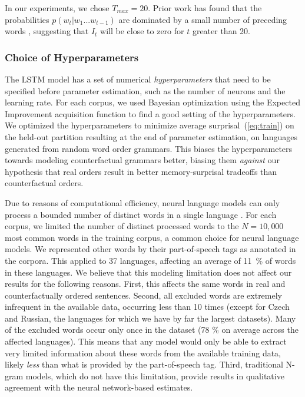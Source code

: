 \documentclass[11pt,letterpaper]{article}
\begin{document}
In our experiments, we chose $T_{max} = 20$. Prior work has found that the probabilities $p(w_t|w_1...w_{t-1})$ are dominated by a small number of preceding words \citep{daniluk2017frustratingly}, suggesting that $I_t$ will be close to zero for $t$ greater than 20.



\subsubsection{Choice of Hyperparameters}

The LSTM model has a set of numerical \emph{hyperparameters} that need to be specified before parameter estimation, such as the number of neurons and the learning rate.
For each corpus, we used Bayesian optimization using the Expected Improvement acquisition function \citep{snoek-practical-2012} to find a good setting of the hyperparameters.
We optimized the hyperparameters to minimize average surprisal~(\ref{eq:train}) on the held-out partition resulting at the end of parameter estimation, on languages generated from random word order grammars.
This biases the hyperparameters towards modeling counterfactual grammars better, biasing them \emph{against} our hypothesis that real orders result in better memory-surprisal tradeoffs than counterfactual orders.

Due to reasons of computational efficiency, neural language models can only process a bounded number of distinct words in a single language \citep{mikolov-recurrent-2010}.
For each corpus, we limited the number of distinct processed words to the $N=10,000$ most common words in the training corpus, a common choice for neural language models.
We represented other words by their part-of-speech tags as annotated in the corpora.
This applied to 37 languages, affecting an average of 11~\% of words in these languages.
We believe that this modeling limitation does not affect our results for the following reasons.
First, this affects the same words in real and counterfactually ordered sentences.
Second, all excluded words are extremely infrequent in the available data, occurring less than 10 times (except for Czech and Russian, the languages for which we have by far the largest datasets).
Many of the excluded words occur only once in the dataset (78 \% on average across the affected languages).
This means that any model would only be able to extract very limited information about these words from the available training data, likely \emph{less} than what is provided by the part-of-speech tag.
Third, traditional N-gram models, which do not have this limitation, provide results in qualitative agreement with the neural network-based estimates.
\end{document}
